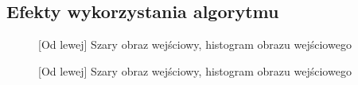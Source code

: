 \documentclass[a4paper,12pt, titlepage]{report}
\begin{document}
\subsection*{Efekty wykorzystania algorytmu}
\begin{figure}[h]
    \centering
    \caption{[Od lewej] Szary obraz wejściowy, histogram obrazu wejściowego}%
    \label{fig:rysunek}%
\end{figure}
\FloatBarrier
\begin{figure}[h]
    \centering
    \caption{[Od lewej] Szary obraz wejściowy, histogram obrazu wejściowego}%
    \label{fig:rysunek}%
\end{figure}
\FloatBarrier
\end{document}
